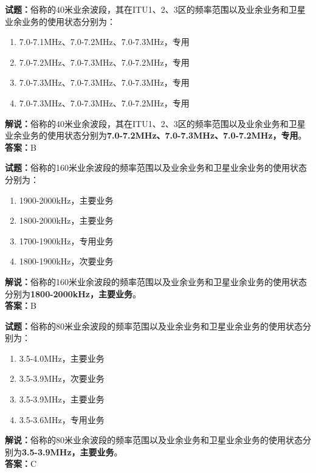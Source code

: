 \documentclass{ctexbook}
\begin{document}
\bigskip


\noindent\textbf{试题：}俗称的40米业余波段，其在ITU1、2、3区的频率范围以及业余业务和卫星业余业务的使用状态分别为：
\begin{enumerate}[leftmargin=3em]
\item 7.0-7.1MHz、7.0-7.2MHz、7.0-7.3MHz，专用
\item 7.0-7.2MHz、7.0-7.3MHz、7.0-7.2MHz，专用
\item 7.0-7.3MHz、7.0-7.3MHz、7.0-7.3MHz，专用
\item 7.0-7.3MHz、7.0-7.3MHz、7.0-7.2MHz，专用
\end{enumerate}
\noindent\textbf{解说：}俗称的40米业余波段，其在ITU1、2、3区的频率范围以及业余业务和卫星业余业务的使用状态分别为\textbf{7.0-7.2MHz、7.0-7.3MHz、7.0-7.2MHz，专用}。\\\noindent\textbf{答案：}B




\bigskip


\noindent\textbf{试题：}俗称的160米业余波段的频率范围以及业余业务和卫星业余业务的使用状态分别为：
\begin{enumerate}[leftmargin=3em]
\item 1900-2000kHz，主要业务
\item 1800-2000kHz，主要业务
\item 1700-1900kHz，专用业务
\item 1800-1900kHz，次要业务
\end{enumerate}
\noindent\textbf{解说：}俗称的160米业余波段的频率范围以及业余业务和卫星业余业务的使用状态分别为\textbf{1800-2000kHz，主要业务}。\\\noindent\textbf{答案：}B



\bigskip


\noindent\textbf{试题：}俗称的80米业余波段的频率范围以及业余业务和卫星业余业务的使用状态分别为：
\begin{enumerate}[leftmargin=3em]
\item 3.5-4.0MHz，主要业务
\item 3.5-3.9MHz，次要业务
\item 3.5-3.9MHz，主要业务
\item 3.5-3.6MHz，专用业务
\end{enumerate}
\noindent\textbf{解说：}俗称的80米业余波段的频率范围以及业余业务和卫星业余业务的使用状态分别为\textbf{3.5-3.9MHz，主要业务}。\\\noindent\textbf{答案：}C
\end{document}
